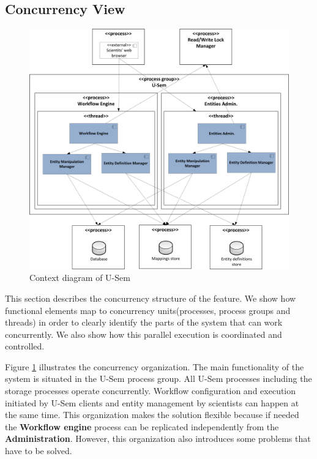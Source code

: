 \subsection{Concurrency View}

\begin{figure}[h!]
  \centering
  	\includegraphics[scale=0.5]{storage/functional/concur.png}
  \caption{Context diagram of U-Sem }
  \label{fig:storageConc}
\end{figure}

This section describes the concurrency structure of the feature. We show how functional elements map to concurrency units(processes, process groups and threads) in order to clearly identify the parts of the system that can work concurrently. We also show how this parallel execution is coordinated and controlled.

Figure \ref{fig:storageConc} illustrates the concurrency organization. The main functionality of the system is situated in the U-Sem process group. All U-Sem processes including the storage processes operate concurrently. Workflow configuration and execution initiated by U-Sem clients and entity management by scientists can happen at the same time. This organization makes the solution flexible because if needed the \textbf{Workflow engine} process can be replicated independently from the \textbf{Administration}. However, this organization also introduces some problems that have to be solved.

